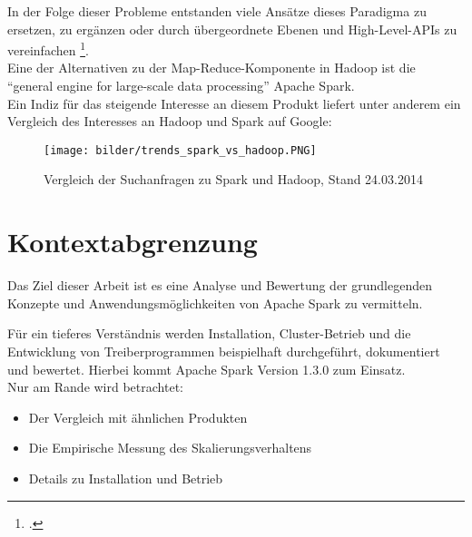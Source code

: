In der Folge dieser Probleme entstanden viele Ansätze dieses Paradigma zu ersetzen, zu ergänzen oder durch übergeordnete Ebenen und High-Level-APIs zu vereinfachen \footcite{Sin14}.\\

Eine der Alternativen zu der Map-Reduce-Komponente in Hadoop ist die "`general engine for large-scale data processing"' Apache Spark.\\

Ein Indiz für das steigende Interesse an diesem Produkt liefert unter anderem ein Vergleich des Interesses an Hadoop und Spark auf Google:\\

\begin{figure}[h]
\texttt{[image: bilder/trends\_spark\_vs\_hadoop.PNG]}
\caption[Google Trends]{Vergleich der Suchanfragen zu Spark und Hadoop, Stand 24.03.2014 \cite{googletrends}}
\end{figure}

\section{Kontextabgrenzung}
Das Ziel dieser Arbeit ist es eine Analyse und Bewertung der grundlegenden Konzepte und Anwendungsmöglichkeiten von Apache Spark zu vermitteln.

Für ein tieferes Verständnis werden Installation, Cluster-Betrieb und die Entwicklung von Treiberprogrammen beispielhaft durchgeführt, dokumentiert und bewertet. Hierbei kommt Apache Spark Version 1.3.0 zum Einsatz.\\

Nur am Rande wird betrachtet:
\begin{itemize}
	\item Der Vergleich mit ähnlichen Produkten
	\item Die Empirische Messung des Skalierungsverhaltens
	\item Details zu Installation und Betrieb
\end{itemize}
